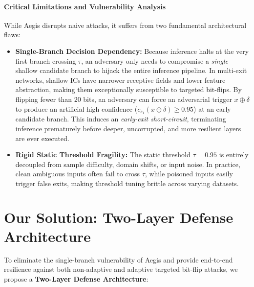 \documentclass[conference]{IEEEtran}
\begin{document}
\paragraph{Critical Limitations and Vulnerability Analysis}
While Aegis disrupts naive attacks, it suffers from two fundamental architectural flaws:
\begin{itemize}
    \item \textbf{Single-Branch Decision Dependency:} Because inference halts at the very first branch crossing $\tau$, an adversary only needs to compromise a \textit{single} shallow candidate branch to hijack the entire inference pipeline. In multi-exit networks, shallow ICs have narrower receptive fields and lower feature abstraction, making them exceptionally susceptible to targeted bit-flips. By flipping fewer than 20 bits, an adversary can force an adversarial trigger $x \oplus \delta$ to produce an artificial high confidence ($c_{s_1}(x \oplus \delta) \ge 0.95$) at an early candidate branch. This induces an \textit{early-exit short-circuit}, terminating inference prematurely before deeper, uncorrupted, and more resilient layers are ever executed.
    \item \textbf{Rigid Static Threshold Fragility:} The static threshold $\tau = 0.95$ is entirely decoupled from sample difficulty, domain shifts, or input noise. In practice, clean ambiguous inputs often fail to cross $\tau$, while poisoned inputs easily trigger false exits, making threshold tuning brittle across varying datasets.
\end{itemize}

\section{Our Solution: Two-Layer Defense Architecture}

To eliminate the single-branch vulnerability of Aegis and provide end-to-end resilience against both non-adaptive and adaptive targeted bit-flip attacks, we propose a \textbf{Two-Layer Defense Architecture}:
\end{document}
